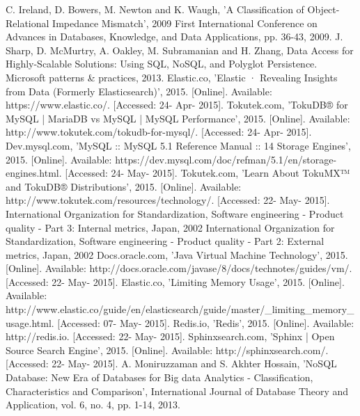 \begin{thebibliography}{69}
 C.  Ireland, D.  Bowers, M.  Newton and K.  Waugh, 'A Classification of Object-Relational Impedance Mismatch', 2009 First International Conference on Advances in Databases, Knowledge, and Data Applications, pp. 36-43, 2009.
 J.  Sharp, D.  McMurtry, A.  Oakley, M.  Subramanian and H.  Zhang, Data Access for Highly-Scalable Solutions: Using SQL, NoSQL, and Polyglot Persistence. Microsoft patterns \& practices, 2013.
 Elastic.co, 'Elastic · Revealing Insights from Data (Formerly Elasticsearch)', 2015. [Online]. Available: https://www.elastic.co/. [Accessed: 24- Apr- 2015].
 Tokutek.com, 'TokuDB® for MySQL | MariaDB vs MySQL | MySQL Performance', 2015. [Online]. Available: http://www.tokutek.com/tokudb-for-mysql/. [Accessed: 24- Apr- 2015].
 Dev.mysql.com, 'MySQL :: MySQL 5.1 Reference Manual :: 14 Storage Engines', 2015. [Online]. Available: https://dev.mysql.com/doc/refman/5.1/en/storage-engines.html. [Accessed: 24- May- 2015].
 Tokutek.com, 'Learn About TokuMX™ and TokuDB® Distributions', 2015. [Online]. Available: http://www.tokutek.com/resources/technology/. [Accessed: 22- May- 2015].
 International Organization for Standardization, Software engineering - Product quality - Part 3: Internal metrics, Japan, 2002
 International Organization for Standardization, Software engineering - Product quality - Part 2: External metrics, Japan, 2002   
 Docs.oracle.com, 'Java Virtual Machine Technology', 2015. [Online]. Available: http://docs.oracle.com/javase/8/docs/technotes/guides/vm/. [Accessed: 22- May- 2015].
 Elastic.co, 'Limiting Memory Usage', 2015. [Online]. Available: http://www.elastic.co/guide/en/elasticsearch/guide/master/\_limiting\_memory\_usage.html. [Accessed: 07- May- 2015].
 Redis.io, 'Redis', 2015. [Online]. Available: http://redis.io. [Accessed: 22- May- 2015].
 Sphinxsearch.com, 'Sphinx | Open Source Search Engine', 2015. [Online]. Available: http://sphinxsearch.com/. [Accessed: 22- May- 2015].
 A. Moniruzzaman and S. Akhter Hossain, 'NoSQL Database: New Era of Databases for Big data Analytics - Classification, Characteristics and Comparison', International Journal of Database Theory and Application, vol. 6, no. 4, pp. 1-14, 2013.


\end{thebibliography}

